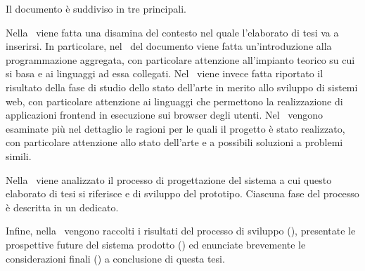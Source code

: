 \bigskip

Il documento è suddiviso in tre  principali.

Nella~ viene fatta una disamina del contesto nel quale l'elaborato di tesi va a inserirsi.
In particolare, nel~ del documento viene fatta un'introduzione alla programmazione aggregata, con particolare attenzione all'impianto teorico su cui si basa e ai linguaggi ad essa collegati.
Nel~ viene invece fatta riportato il risultato della fase di studio dello stato dell'arte in merito allo sviluppo di sistemi web,
con particolare attenzione ai linguaggi che permettono la realizzazione di applicazioni frontend in esecuzione sui browser degli utenti.
Nel~ vengono esaminate più nel dettaglio le ragioni per le quali il progetto è stato realizzato,
con particolare attenzione allo stato dell'arte e a possibili soluzioni a problemi simili.

Nella~ viene analizzato il processo di progettazione del sistema a cui questo elaborato di tesi si riferisce e di sviluppo del prototipo.
Ciascuna fase del processo è descritta in un  dedicato.

Infine, nella~ vengono raccolti i risultati del processo di sviluppo (), presentate le prospettive future del sistema prodotto () ed enunciate brevemente le considerazioni finali () a conclusione di questa tesi.
